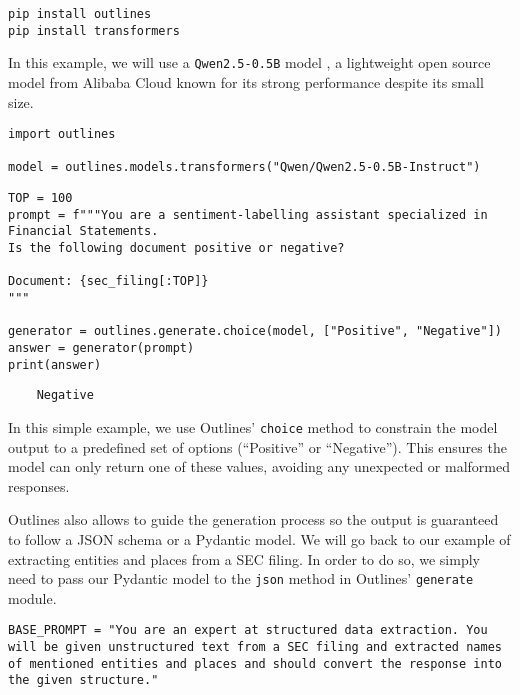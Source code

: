 \begin{verbatim}
pip install outlines
pip install transformers
\end{verbatim}

In this example, we will use a \texttt{Qwen2.5-0.5B} model , a lightweight open source model from Alibaba Cloud known for its strong performance despite its small size.

\begin{verbatim}
import outlines

model = outlines.models.transformers("Qwen/Qwen2.5-0.5B-Instruct")
\end{verbatim}

\begin{verbatim}
TOP = 100
prompt = f"""You are a sentiment-labelling assistant specialized in Financial Statements.
Is the following document positive or negative?

Document: {sec_filing[:TOP]}
"""

generator = outlines.generate.choice(model, ["Positive", "Negative"])
answer = generator(prompt)
print(answer)
\end{verbatim}

\begin{verbatim}
    Negative
\end{verbatim}

In this simple example, we use Outlines' \texttt{choice} method to constrain the model output to a predefined set of options (``Positive'' or ``Negative''). This ensures the model can only return one of these values, avoiding any unexpected or malformed responses.

Outlines also allows to guide the generation process so the output is guaranteed to follow a JSON schema or a Pydantic model. We will go back to our example of extracting entities and places from a SEC filing. In order to do so, we simply need to pass our Pydantic model to the \texttt{json} method in Outlines' \texttt{generate} module.

\begin{verbatim}
BASE_PROMPT = "You are an expert at structured data extraction. You will be given unstructured text from a SEC filing and extracted names of mentioned entities and places and should convert the response into the given structure."
\end{verbatim}

